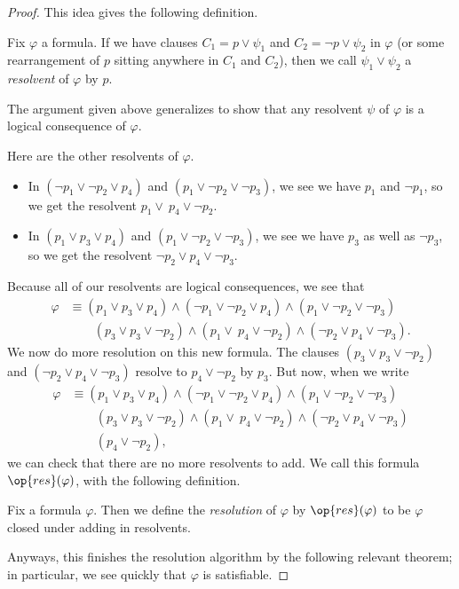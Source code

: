 \documentclass[../notes.tex]{subfiles}
\begin{document}
\begin{proof}
	This idea gives the following definition.
	\begin{definition}[Resolvent]
		Fix $\varphi$ a formula. If we have clauses $C_1=p\lor\psi_1$ and $C_2=\lnot p\lor\psi_2$ in $\varphi$ (or some rearrangement of $p$ sitting anywhere in $C_1$ and $C_2$), then we call $\psi_1\lor\psi_2$ a \textit{resolvent} of $\varphi$ by $p$.
	\end{definition}
	\begin{remark}
		The argument given above generalizes to show that any resolvent $\psi$ of $\varphi$ is a logical consequence of $\varphi$.
	\end{remark}
	Here are the other resolvents of $\varphi$.
	\begin{itemize}
		\item In $(\lnot p_1\lor\lnot p_2\lor p_4)$ and $(p_1\lor\lnot p_2\lor\lnot p_3)$, we see we have $p_1$ and $\lnot p_1$, so we get the resolvent $p_1\lor\ p_4\lor\lnot p_2$.
		\item In $(p_1\lor p_3\lor p_4)$ and $(p_1\lor\lnot p_2\lor\lnot p_3)$, we see we have $p_3$ as well as $\lnot p_3$, so we get the resolvent $\lnot p_2\lor p_4\lor\lnot p_3$.
	\end{itemize}
	Because all of our resolvents are logical consequences, we see that
	\begin{align*}
		\varphi &\equiv (p_1\lor p_3\lor p_4)\land(\lnot p_1\lor\lnot p_2\lor p_4)\land(p_1\lor\lnot p_2\lor\lnot p_3) \\
		&\qquad (p_3\lor p_3\lor\lnot p_2)\land(p_1\lor\ p_4\lor\lnot p_2)\land(\lnot p_2\lor p_4\lor\lnot p_3).
	\end{align*}
	We now do more resolution on this new formula. The clauses $(p_3\lor p_3\lor\lnot p_2)$ and $(\lnot p_2\lor p_4\lor\lnot p_3)$ resolve to $p_4\lor\lnot p_2$ by $p_3$. But now, when we write
	\begin{align*}
		\varphi &\equiv (p_1\lor p_3\lor p_4)\land(\lnot p_1\lor\lnot p_2\lor p_4)\land(p_1\lor\lnot p_2\lor\lnot p_3) \\
		&\qquad (p_3\lor p_3\lor\lnot p_2)\land(p_1\lor\ p_4\lor\lnot p_2)\land(\lnot p_2\lor p_4\lor\lnot p_3) \\
		&\qquad (p_4\lor\lnot p_2),
	\end{align*}
	we can check that there are no more resolvents to add. We call this formula $\op{res}(\varphi)$, with the following definition.
	\begin{definition}[Resolution]
		Fix a formula $\varphi$. Then we define the \textit{resolution} of $\varphi$ by $\op{res}(\varphi)$ to be $\varphi$ closed under adding in resolvents.
	\end{definition}
	Anyways, this finishes the resolution algorithm by the following relevant theorem; in particular, we see quickly that $\varphi$ is satisfiable.
\end{proof}
\end{document}
